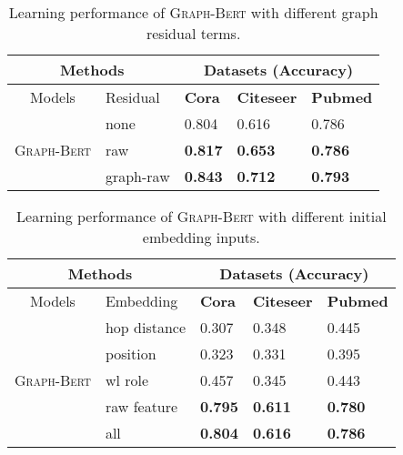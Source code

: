 \documentclass{article}
\newcommand{\our}{\textsc{Graph-Bert}}
\begin{document}
\begin{table}[t]
\caption{Learning performance of {\our} with different graph residual terms.}\label{tab:graph_residual}
 \small
\centering
\setlength{\tabcolsep}{3.5pt}
\begin{tabular}{|c|l|p{1.2cm}|p{1.2cm}|p{1.2cm}|}
\hline
\multicolumn{2}{|c}{Methods } & \multicolumn{3}{|c|}{Datasets (Accuracy)} \\
\hline
Models & Residual & {\textbf{Cora}} & {\textbf{Citeseer}} & {\textbf{Pubmed}} \\
\hline 
\hline 
\multirow{3}{*}{{\our}}
&none &0.804   &{0.616}  &0.786   \\
\cline{2-5}
&raw&\textbf{0.817}  &\textbf{0.653}  &\textbf{0.786}   \\
\cline{2-5}
&graph-raw&\textbf{0.843}   &\textbf{0.712}  &\textbf{0.793}  \\
\hline
\end{tabular}
\end{table}


\begin{table}[t]
\caption{Learning performance of {\our} with different initial embedding inputs.}\label{tab:embedding_analysis}
 \small
\centering
\setlength{\tabcolsep}{3.5pt}
\begin{tabular}{|c|l|p{1.2cm}|p{1.2cm}|p{1.2cm}|}
\hline
\multicolumn{2}{|c}{Methods } & \multicolumn{3}{|c|}{Datasets (Accuracy)} \\
\hline
Models & Embedding & {\textbf{Cora}} & {\textbf{Citeseer}} & {\textbf{Pubmed}} \\
\hline 
\hline 
\multirow{5}{*}{{\our}}
&hop distance&{0.307}   &0.348  &{0.445}  \\
\cline{2-5}
&position&{0.323}   &0.331  &{0.395}  \\
\cline{2-5}
&wl role&0.457   &{0.345}  &0.443   \\
\cline{2-5}
&raw feature&\textbf{0.795}  &\textbf{0.611}  &\textbf{0.780}   \\
\cline{2-5}
&all&\textbf{0.804}   &\textbf{0.616}  &\textbf{0.786}  \\
\hline
\end{tabular}
\end{table}
\end{document}
